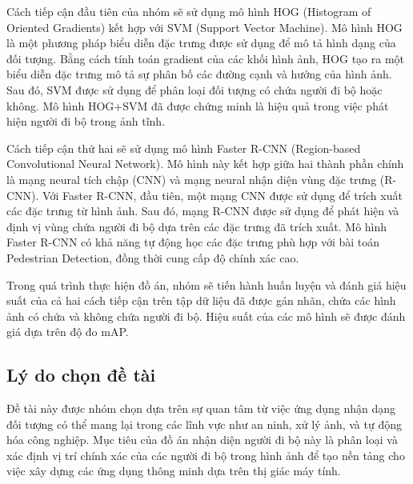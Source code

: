 Cách tiếp cận đầu tiên của nhóm sẽ sử dụng mô hình HOG (Histogram of Oriented Gradients) kết hợp với SVM (Support Vector Machine). Mô hình HOG là một phương pháp biểu diễn đặc trưng được sử dụng để mô tả hình dạng của đối tượng. Bằng cách tính toán gradient của các khối hình ảnh, HOG tạo ra một biểu diễn đặc trưng mô tả sự phân bố các đường cạnh và hướng của hình ảnh. Sau đó, SVM được sử dụng để phân loại đối tượng có chứa người đi bộ hoặc không. Mô hình HOG+SVM đã được chứng minh là hiệu quả trong việc phát hiện người đi bộ trong ảnh tĩnh.

Cách tiếp cận thứ hai sẽ sử dụng mô hình Faster R-CNN (Region-based Convolutional Neural Network). Mô hình này kết hợp giữa hai thành phần chính là mạng neural tích chập (CNN) và mạng neural nhận diện vùng đặc trưng (R-CNN). Với Faster R-CNN, đầu tiên, một mạng CNN được sử dụng để trích xuất các đặc trưng từ hình ảnh. Sau đó, mạng R-CNN được sử dụng để phát hiện và định vị vùng chứa người đi bộ dựa trên các đặc trưng đã trích xuất. Mô hình Faster R-CNN có khả năng tự động học các đặc trưng phù hợp với bài toán Pedestrian Detection, đồng thời cung cấp độ chính xác cao.

Trong quá trình thực hiện đồ án, nhóm sẽ tiến hành huấn luyện và đánh giá hiệu suất của cả hai cách tiếp cận trên tập dữ liệu đã được gán nhãn, chứa các hình ảnh có chứa và không chứa người đi bộ. Hiệu suất của các mô hình sẽ được đánh giá dựa trên độ đo mAP.

\subsection{Lý do chọn đề tài}
Đề tài này được nhóm chọn dựa trên sự quan tâm từ việc ứng dụng nhận dạng đối tượng có thể mang lại trong các lĩnh vực như an ninh, xử lý ảnh, và tự động hóa công nghiệp. Mục tiêu của đồ án nhận diện người đi bộ này là phân loại và xác định vị trí chính xác của các người đi bộ trong hình ảnh để tạo nền tảng cho việc xây dựng các ứng dụng thông minh dựa trên thị giác máy tính.


